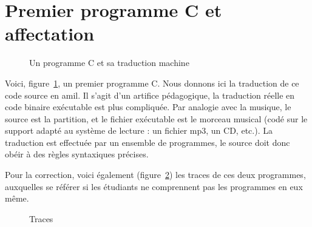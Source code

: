 \section{Premier programme C et affectation}


\begin{figure}[h]
  \centering
  \hfill
\caption{Un programme C et sa traduction machine}
\label{fig:programmes}
\end{figure}


Voici, figure~\ref{fig:programmes}, un premier programme C. 
Nous donnons ici la traduction de ce code source en amil. Il s'agit d'un artifice pédagogique, la traduction réelle en code binaire exécutable est plus compliquée.  Par analogie avec la musique, le source est la partition, et le fichier exécutable est le morceau musical (codé sur le support adapté au système de lecture : un fichier mp3, un CD, etc.). La traduction est effectuée par un ensemble de programmes, le source doit donc obéir à des règles syntaxiques précises.  

\begin{correction}
Pour la correction, voici également (figure~\ref{fig:traces}) les traces de ces deux programmes,
auxquelles se référer si les étudiants ne comprennent pas les
programmes en eux même. 
\begin{figure}[htbp]
  \centering
  \caption{Traces}
\label{fig:traces}
\end{figure}
\end{correction}

